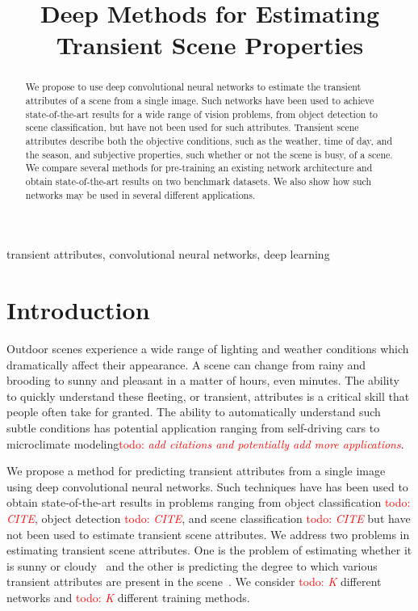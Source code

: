 \documentclass{article}
\title{Deep Methods for Estimating Transient Scene Properties}
\newcommand{\todo}[1]{\textcolor{red}{todo: {\em #1}}}
\begin{document}
\maketitle

\begin{abstract}

We propose to use deep convolutional neural networks to estimate the
transient attributes of a scene from a single image. Such networks
have been used to achieve state-of-the-art results for a wide range of
vision problems, from object detection to scene classification, but
have not been used for such attributes. Transient scene attributes
describe both the objective conditions, such as the weather, time of
day, and the season, and subjective properties, such whether or not
the scene is busy, of a scene. We compare several methods for
pre-training an existing network architecture and obtain
state-of-the-art results on two benchmark datasets.  We also show how
such networks may be used in several different applications.

\end{abstract}

\begin{keywords}
transient attributes, convolutional neural networks, deep learning
\end{keywords}

\section{Introduction}


Outdoor scenes experience a wide range of lighting and weather
conditions which dramatically affect their appearance. A scene can
change from rainy and brooding to sunny and pleasant in a matter of
hours, even minutes. The ability to quickly understand these fleeting,
or transient, attributes is a critical skill that people often take
for granted. The ability to automatically understand such subtle
conditions has potential application ranging from self-driving cars to
microclimate modeling\todo{add citations and potentially add more
applications}.


We propose a method for predicting transient attributes from a single
image using deep convolutional neural networks. Such techniques have
has been used to obtain state-of-the-art results in problems ranging
from object classification \todo{CITE}, object detection \todo{CITE},
and scene classification \todo{CITE} but have not been used to
estimate transient scene attributes. We address two problems in
estimating transient scene attributes. One is the problem of
estimating whether it is sunny or cloudy~\cite{lutwoclass} and the
other is predicting the degree to which various transient attributes
are present in the scene~\cite{Laffont14}. We consider \todo{K}
different networks and \todo{K} different training methods.
\end{document}
